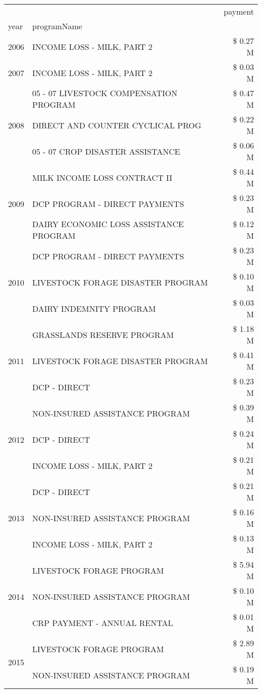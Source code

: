 \begin{tabular}{llr}
\toprule
 &  & payment \\
year & programName &  \\
\midrule
2006 & INCOME LOSS - MILK, PART 2 & \$ 0.27 M \\
\cline{1-3}
2007 & INCOME LOSS - MILK, PART 2 & \$ 0.03 M \\
\cline{1-3}
\multirow[t]{3}{*}{2008} & 05 - 07 LIVESTOCK COMPENSATION PROGRAM & \$ 0.47 M \\
 & DIRECT AND COUNTER CYCLICAL PROG & \$ 0.22 M \\
 & 05 - 07 CROP DISASTER ASSISTANCE & \$ 0.06 M \\
\cline{1-3}
\multirow[t]{3}{*}{2009} & MILK INCOME LOSS CONTRACT II & \$ 0.44 M \\
 & DCP PROGRAM - DIRECT PAYMENTS & \$ 0.23 M \\
 & DAIRY ECONOMIC LOSS ASSISTANCE PROGRAM & \$ 0.12 M \\
\cline{1-3}
\multirow[t]{3}{*}{2010} & DCP PROGRAM - DIRECT PAYMENTS & \$ 0.23 M \\
 & LIVESTOCK FORAGE DISASTER  PROGRAM & \$ 0.10 M \\
 & DAIRY INDEMNITY PROGRAM & \$ 0.03 M \\
\cline{1-3}
\multirow[t]{3}{*}{2011} & GRASSLANDS RESERVE PROGRAM & \$ 1.18 M \\
 & LIVESTOCK FORAGE DISASTER PROGRAM & \$ 0.41 M \\
 & DCP - DIRECT & \$ 0.23 M \\
\cline{1-3}
\multirow[t]{3}{*}{2012} & NON-INSURED ASSISTANCE PROGRAM & \$ 0.39 M \\
 & DCP - DIRECT & \$ 0.24 M \\
 & INCOME LOSS - MILK, PART 2 & \$ 0.21 M \\
\cline{1-3}
\multirow[t]{3}{*}{2013} & DCP - DIRECT & \$ 0.21 M \\
 & NON-INSURED ASSISTANCE PROGRAM & \$ 0.16 M \\
 & INCOME LOSS - MILK, PART 2 & \$ 0.13 M \\
\cline{1-3}
\multirow[t]{3}{*}{2014} & LIVESTOCK FORAGE PROGRAM & \$ 5.94 M \\
 & NON-INSURED ASSISTANCE PROGRAM & \$ 0.10 M \\
 & CRP PAYMENT - ANNUAL RENTAL & \$ 0.01 M \\
\cline{1-3}
\multirow[t]{3}{*}{2015} & LIVESTOCK FORAGE PROGRAM & \$ 2.89 M \\
 & NON-INSURED ASSISTANCE PROGRAM & \$ 0.19 M \\

\end{tabular}
